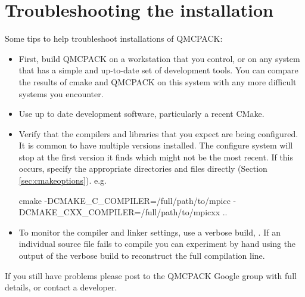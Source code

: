 \section{Troubleshooting the installation}
\label{sec:troubleshoot}
Some tips to help troubleshoot installations of QMCPACK:
\begin{itemize}
\item First, build QMCPACK on a workstation that you control, or on any
  system that has a simple and up-to-date set of development
  tools. You can compare the results of cmake and QMCPACK on this
  system with any more difficult systems you encounter.
\item Use up to date development software, particularly a recent
  CMake.
\item Verify that the compilers and libraries that you expect are
  being configured. It is common to have multiple versions
  installed. The configure system will stop at the first version it
  finds which might not be the most recent. If this occurs, specify the appropriate
  directories and files directly (Section
  \ref{sec:cmakeoptions}). e.g.
  \begin{shade}
  cmake -DCMAKE_C_COMPILER=/full/path/to/mpicc -DCMAKE_CXX_COMPILER=/full/path/to/mpicxx ..
  \end{shade}
\item To monitor the compiler and linker settings, use a verbose build, . If an individual source file fails to compile you
  can experiment by hand using the output of the verbose build to
  reconstruct the full compilation line.
\end{itemize}

If you still have problems please post to the QMCPACK Google group with full
details, or contact a developer.
